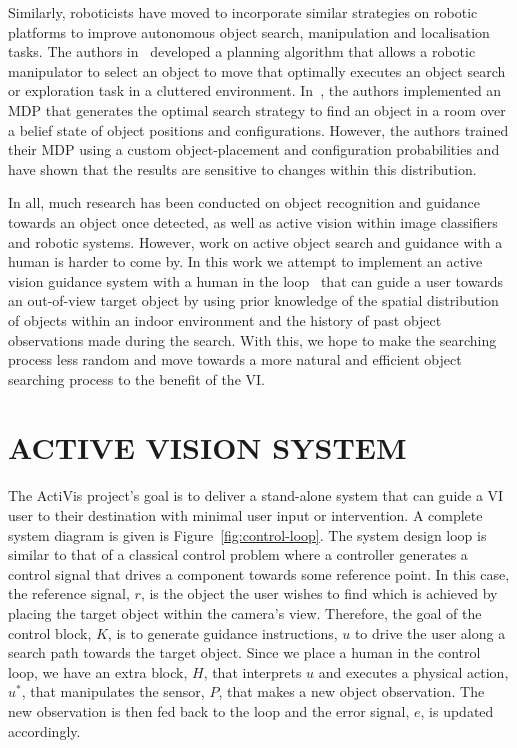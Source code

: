 \documentclass[a4paper, twoside]{article}
\begin{document}
Similarly, roboticists have moved to incorporate similar strategies on robotic platforms to improve autonomous object search, manipulation and localisation tasks. The authors in~\cite{dogar2014object} developed a planning algorithm that allows a robotic manipulator to select an object to move that optimally executes an object search or exploration task in a cluttered environment. In~\cite{aydemir2011search}, the authors implemented an MDP that generates the optimal search strategy to find an object in a room over a belief state of object positions and configurations. However, the authors trained their MDP using a custom object-placement and configuration probabilities and have shown that the results are sensitive to changes within this distribution. 

In all, much research has been conducted on object recognition and guidance towards an object once detected, as well as active vision within image classifiers and robotic systems. However, work on active object search and guidance with a human is harder to come by. In this work we attempt to implement an active vision guidance system with a human in the loop~\cite{bellotto2013,lock2017portable} that can guide a user towards an out-of-view target object by using prior knowledge of the spatial distribution of objects within an indoor environment and the history of past object observations made during the search. With this, we hope to make the searching process less random and move towards a more natural and efficient object searching process to the benefit of the VI\@.  

\section{\uppercase{Active Vision System}}\label{sec:system-design}

\noindent The ActiVis project's goal is to deliver a stand-alone system that can guide a VI user to their destination with minimal user input or intervention. A complete system diagram is given is Figure~\ref{fig:control-loop}. The system design loop is similar to that of a classical control problem where a controller generates a control signal that drives a component towards some reference point. In this case, the reference signal, $r$, is the object the user wishes to find which is achieved by placing the target object within the camera's view. Therefore, the goal of the control block, $K$, is to generate guidance instructions, $u$ to drive the user along a search path towards the target object. Since we place a human in the control loop, we have an extra block, $H$, that interprets $u$ and executes a physical action, $u^*$, that manipulates the sensor, $P$, that makes a new object observation. The new observation is then fed back to the loop and the error signal, $e$, is updated accordingly.  
\end{document}
